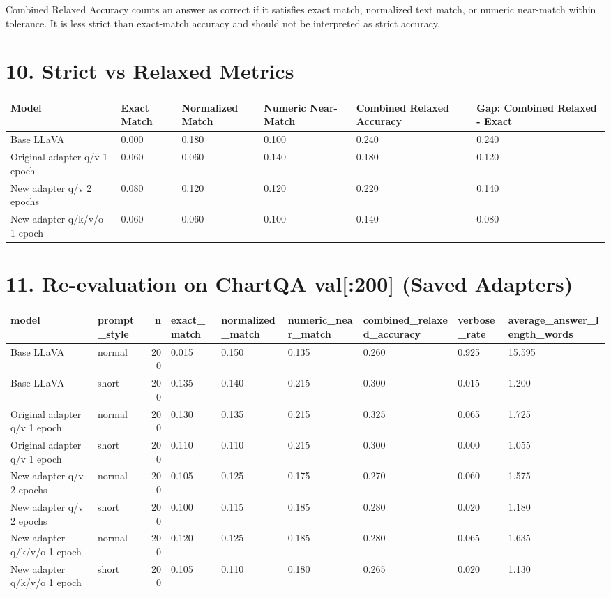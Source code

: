 \documentclass[11pt]{article}
\begin{document}
Combined Relaxed Accuracy counts an answer as correct if it satisfies exact match, normalized text match, or numeric near-match within tolerance. It is less strict than exact-match accuracy and should not be interpreted as strict accuracy.

\section*{10. Strict vs Relaxed Metrics}
\begin{tabular}{llllll}
\toprule
Model & Exact Match & Normalized Match & Numeric Near-Match & Combined Relaxed Accuracy & Gap: Combined Relaxed - Exact \\
\midrule
Base LLaVA & 0.000 & 0.180 & 0.100 & 0.240 & 0.240 \\
Original adapter q/v 1 epoch & 0.060 & 0.060 & 0.140 & 0.180 & 0.120 \\
New adapter q/v 2 epochs & 0.080 & 0.120 & 0.120 & 0.220 & 0.140 \\
New adapter q/k/v/o 1 epoch & 0.060 & 0.060 & 0.100 & 0.140 & 0.080 \\
\bottomrule
\end{tabular}


\section*{11. Re-evaluation on ChartQA val[:200] (Saved Adapters)}
\begin{tabular}{llrllllll}
\toprule
model & prompt\_style & n & exact\_match & normalized\_match & numeric\_near\_match & combined\_relaxed\_accuracy & verbose\_rate & average\_answer\_length\_words \\
\midrule
Base LLaVA & normal & 200 & 0.015 & 0.150 & 0.135 & 0.260 & 0.925 & 15.595 \\
Base LLaVA & short & 200 & 0.135 & 0.140 & 0.215 & 0.300 & 0.015 & 1.200 \\
Original adapter q/v 1 epoch & normal & 200 & 0.130 & 0.135 & 0.215 & 0.325 & 0.065 & 1.725 \\
Original adapter q/v 1 epoch & short & 200 & 0.110 & 0.110 & 0.215 & 0.300 & 0.000 & 1.055 \\
New adapter q/v 2 epochs & normal & 200 & 0.105 & 0.125 & 0.175 & 0.270 & 0.060 & 1.575 \\
New adapter q/v 2 epochs & short & 200 & 0.100 & 0.115 & 0.185 & 0.280 & 0.020 & 1.180 \\
New adapter q/k/v/o 1 epoch & normal & 200 & 0.120 & 0.125 & 0.185 & 0.280 & 0.065 & 1.635 \\
New adapter q/k/v/o 1 epoch & short & 200 & 0.105 & 0.110 & 0.180 & 0.265 & 0.020 & 1.130 \\
\bottomrule
\end{tabular}
\end{document}
